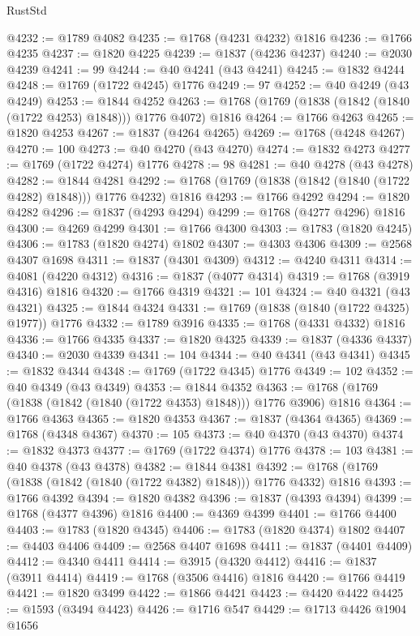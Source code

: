 \begin{lexlean}{RustStd}
\begin{coremodule}
@4232 := @1789 @4082
@4235 := @1768 (@4231 @4232) @1816
@4236 := @1766 @4235
@4237 := @1820 @4225
@4239 := @1837 (@4236 @4237)
@4240 := @2030 @4239
@4241 := 99
@4244 := @40 @4241 (@43 @4241)
@4245 := @1832 @4244
@4248 := @1769 (@1722 @4245) @1776
@4249 := 97
@4252 := @40 @4249 (@43 @4249)
@4253 := @1844 @4252
@4263 := @1768 (@1769 (@1838 (@1842 (@1840 (@1722 @4253) @1848))) @1776 @4072) @1816
@4264 := @1766 @4263
@4265 := @1820 @4253
@4267 := @1837 (@4264 @4265)
@4269 := @1768 (@4248 @4267)
@4270 := 100
@4273 := @40 @4270 (@43 @4270)
@4274 := @1832 @4273
@4277 := @1769 (@1722 @4274) @1776
@4278 := 98
@4281 := @40 @4278 (@43 @4278)
@4282 := @1844 @4281
@4292 := @1768 (@1769 (@1838 (@1842 (@1840 (@1722 @4282) @1848))) @1776 @4232) @1816
@4293 := @1766 @4292
@4294 := @1820 @4282
@4296 := @1837 (@4293 @4294)
@4299 := @1768 (@4277 @4296) @1816
@4300 := @4269 @4299
@4301 := @1766 @4300
@4303 := @1783 (@1820 @4245)
@4306 := @1783 (@1820 @4274) @1802
@4307 := @4303 @4306
@4309 := @2568 @4307 @1698
@4311 := @1837 (@4301 @4309)
@4312 := @4240 @4311
@4314 := @4081 (@4220 @4312)
@4316 := @1837 (@4077 @4314)
@4319 := @1768 (@3919 @4316) @1816
@4320 := @1766 @4319
@4321 := 101
@4324 := @40 @4321 (@43 @4321)
@4325 := @1844 @4324
@4331 := @1769 (@1838 (@1840 (@1722 @4325) @1977)) @1776
@4332 := @1789 @3916
@4335 := @1768 (@4331 @4332) @1816
@4336 := @1766 @4335
@4337 := @1820 @4325
@4339 := @1837 (@4336 @4337)
@4340 := @2030 @4339
@4341 := 104
@4344 := @40 @4341 (@43 @4341)
@4345 := @1832 @4344
@4348 := @1769 (@1722 @4345) @1776
@4349 := 102
@4352 := @40 @4349 (@43 @4349)
@4353 := @1844 @4352
@4363 := @1768 (@1769 (@1838 (@1842 (@1840 (@1722 @4353) @1848))) @1776 @3906) @1816
@4364 := @1766 @4363
@4365 := @1820 @4353
@4367 := @1837 (@4364 @4365)
@4369 := @1768 (@4348 @4367)
@4370 := 105
@4373 := @40 @4370 (@43 @4370)
@4374 := @1832 @4373
@4377 := @1769 (@1722 @4374) @1776
@4378 := 103
@4381 := @40 @4378 (@43 @4378)
@4382 := @1844 @4381
@4392 := @1768 (@1769 (@1838 (@1842 (@1840 (@1722 @4382) @1848))) @1776 @4332) @1816
@4393 := @1766 @4392
@4394 := @1820 @4382
@4396 := @1837 (@4393 @4394)
@4399 := @1768 (@4377 @4396) @1816
@4400 := @4369 @4399
@4401 := @1766 @4400
@4403 := @1783 (@1820 @4345)
@4406 := @1783 (@1820 @4374) @1802
@4407 := @4403 @4406
@4409 := @2568 @4407 @1698
@4411 := @1837 (@4401 @4409)
@4412 := @4340 @4411
@4414 := @3915 (@4320 @4412)
@4416 := @1837 (@3911 @4414)
@4419 := @1768 (@3506 @4416) @1816
@4420 := @1766 @4419
@4421 := @1820 @3499
@4422 := @1866 @4421
@4423 := @4420 @4422
@4425 := @1593 (@3494 @4423)
@4426 := @1716 @547
@4429 := @1713 @4426 @1904 @1656

\end{coremodule}
\end{lexlean}
